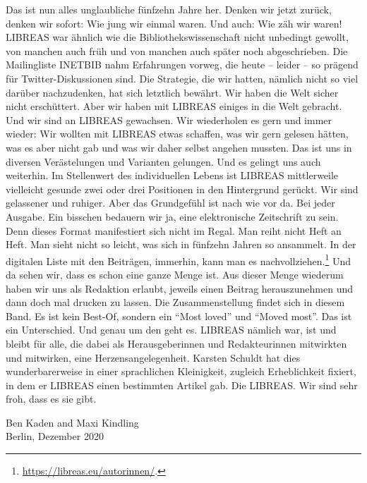 \documentclass[output=paper]{langsci/langscibook}
\begin{document}
Das ist nun alles unglaubliche fünfzehn Jahre her. Denken wir jetzt
zurück, denken wir sofort: Wie jung wir einmal waren. Und auch: Wie zäh
wir waren! LIBREAS war ähnlich wie die Bibliothekswissenschaft nicht
unbedingt gewollt, von manchen auch früh und von manchen auch später
noch abgeschrieben. Die Mailingliste INETBIB nahm Erfahrungen vorweg,
die heute -- leider -- so prägend für Twitter-Diskussionen sind. Die
Strategie, die wir hatten, nämlich nicht so viel darüber nachzudenken,
hat sich letztlich bewährt. Wir haben die Welt sicher nicht erschüttert.
Aber wir haben mit LIBREAS einiges in die Welt gebracht. Und wir sind an
LIBREAS gewachsen. Wir wiederholen es gern und immer wieder: Wir wollten
mit LIBREAS etwas schaffen, was wir gern gelesen hätten, was es aber
nicht gab und was wir daher selbst angehen mussten. Das ist uns in
diversen Verästelungen und Varianten gelungen. Und es gelingt uns auch
weiterhin. Im Stellenwert des individuellen Lebens ist LIBREAS
mittlerweile vielleicht gesunde zwei oder drei Positionen in den
Hintergrund gerückt. Wir sind gelassener und ruhiger. Aber das
Grundgefühl ist nach wie vor da. Bei jeder Ausgabe. Ein bisschen
bedauern wir ja, eine elektronische Zeitschrift zu sein. Denn dieses
Format manifestiert sich nicht im Regal. Man reiht nicht Heft an Heft.
Man sieht nicht so leicht, was sich in fünfzehn Jahren so ansammelt. In
der digitalen Liste mit den Beiträgen, immerhin, kann man es
nachvollziehen.\footnote{\url{https://libreas.eu/autorinnen/}.} Und da
sehen wir, dass es schon eine ganze Menge ist. Aus dieser Menge wiederum
haben wir uns als Redaktion erlaubt, jeweils einen Beitrag
herauszunehmen und dann doch mal drucken zu lassen. Die Zusammenstellung
findet sich in diesem Band. Es ist kein Best-Of, sondern ein
\enquote{Most loved} und \enquote{Moved most}. Das ist ein Unterschied.
Und genau um den geht es. LIBREAS nämlich war, ist und bleibt für alle,
die dabei als Herausgeberinnen und Redakteurinnen mitwirkten und
mitwirken, eine Herzensangelegenheit. Karsten Schuldt hat dies
wunderbarerweise in einer sprachlichen Kleinigkeit, zugleich
Erheblichkeit fixiert, in dem er LIBREAS einen bestimmten Artikel gab.
Die LIBREAS. Wir sind sehr froh, dass es sie gibt.

\begin{flushright}
Ben Kaden and Maxi Kindling\\
Berlin, Dezember 2020
\end{flushright}


\end{document}
